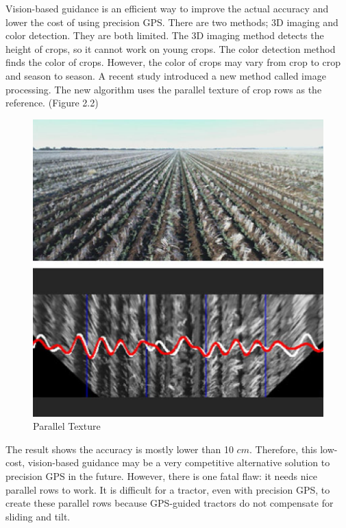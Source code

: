 Vision-based guidance is an efficient way to improve the actual accuracy and lower the cost of using precision GPS. There are two methods; 3D imaging and color detection. They are both limited. The 3D imaging method detects the height of crops, so it cannot work on young crops. The color detection method finds the color of crops. However, the color of crops may vary from crop to crop and season to season. A recent study introduced a new method called image processing. The new algorithm uses the parallel texture of crop rows as the reference. \cite{english2014vision} (Figure 2.2)

\begin{figure}[ht!]
\begin{center}
\includegraphics[scale = 0.5]{pics/parallel.jpg}
\caption{Parallel Texture}
\end{center}
\end{figure}

The result shows the accuracy is mostly lower than 10 $cm$. Therefore, this low-cost, vision-based guidance may be a very competitive alternative solution to precision GPS in the future. However, there is one fatal flaw: it needs nice parallel rows to work. It is difficult for a tractor, even with precision GPS, to create these parallel rows because  GPS-guided tractors do not compensate for sliding and tilt.

